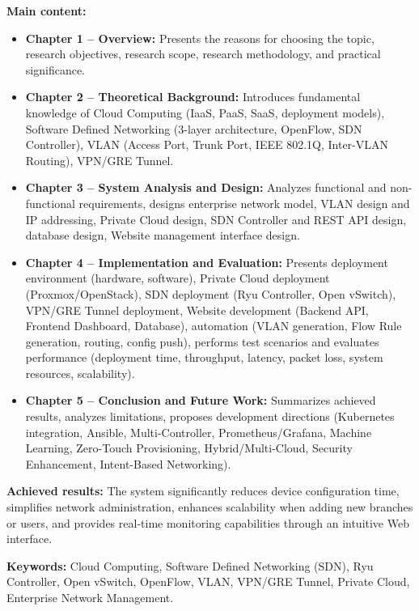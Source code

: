 \textbf{Main content:}
\begin{itemize}
    \item \textbf{Chapter 1 -- Overview:} Presents the reasons for choosing the topic, research objectives, research scope, research methodology, and practical significance.
    
    \item \textbf{Chapter 2 -- Theoretical Background:} Introduces fundamental knowledge of Cloud Computing (IaaS, PaaS, SaaS, deployment models), Software Defined Networking (3-layer architecture, OpenFlow, SDN Controller), VLAN (Access Port, Trunk Port, IEEE 802.1Q, Inter-VLAN Routing), VPN/GRE Tunnel.
    
    \item \textbf{Chapter 3 -- System Analysis and Design:} Analyzes functional and non-functional requirements, designs enterprise network model, VLAN design and IP addressing, Private Cloud design, SDN Controller and REST API design, database design, Website management interface design.
    
    \item \textbf{Chapter 4 -- Implementation and Evaluation:} Presents deployment environment (hardware, software), Private Cloud deployment (Proxmox/OpenStack), SDN deployment (Ryu Controller, Open vSwitch), VPN/GRE Tunnel deployment, Website development (Backend API, Frontend Dashboard, Database), automation (VLAN generation, Flow Rule generation, routing, config push), performs test scenarios and evaluates performance (deployment time, throughput, latency, packet loss, system resources, scalability).
    
    \item \textbf{Chapter 5 -- Conclusion and Future Work:} Summarizes achieved results, analyzes limitations, proposes development directions (Kubernetes integration, Ansible, Multi-Controller, Prometheus/Grafana, Machine Learning, Zero-Touch Provisioning, Hybrid/Multi-Cloud, Security Enhancement, Intent-Based Networking).
\end{itemize}

\textbf{Achieved results:} The system significantly reduces device configuration time, simplifies network administration, enhances scalability when adding new branches or users, and provides real-time monitoring capabilities through an intuitive Web interface.

\textbf{Keywords:} Cloud Computing, Software Defined Networking (SDN), Ryu Controller, Open vSwitch, OpenFlow, VLAN, VPN/GRE Tunnel, Private Cloud, Enterprise Network Management.
